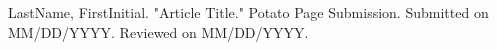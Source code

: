 \documentclass[11pt]{article}
\begin{document}
\begin{thebibliography}{9}
	{\footnotesize
	 LastName, FirstInitial. "Article Title." Potato Page Submission. Submitted on MM/DD/YYYY. Reviewed on MM/DD/YYYY.
	}
\end{thebibliography}

\end{document}
